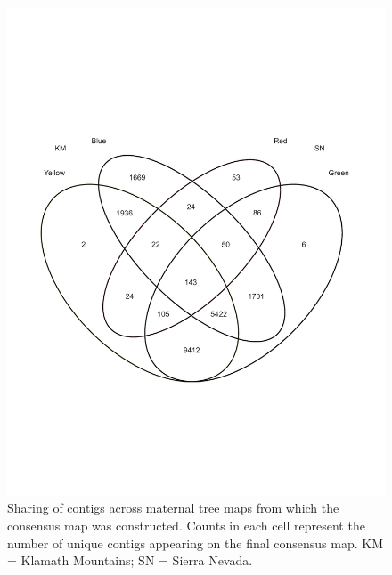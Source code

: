 \documentclass[11pt]{article}
\begin{document}
\clearpage

\begin{figure}[ht]
  \centering
  \includegraphics[width=1.0\textwidth]{Figure02_TGG}
  \caption{Sharing of contigs across maternal tree maps from which the consensus map was constructed. Counts in each cell
  represent the number of unique contigs appearing on the final consensus map. KM = Klamath Mountains; SN = Sierra Nevada.}
  \label{f:Figure02_TGG}
\end{figure}
\end{document}
